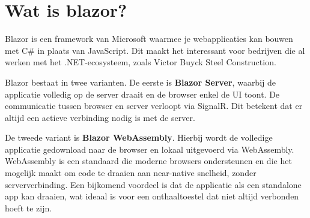 

\chapter{Wat is blazor?}

Blazor is een framework van Microsoft waarmee je webapplicaties kan bouwen 
met C\# in plaats van JavaScript. Dit maakt het interessant voor bedrijven 
die al werken met het .NET-ecosysteem, zoals Victor Buyck Steel Construction.

\bigskip
Blazor bestaat in twee varianten. De eerste is \textbf{Blazor Server}, waarbij 
de applicatie volledig op de server draait en de browser enkel de UI toont. 
De communicatie tussen browser en server verloopt via SignalR. Dit betekent 
dat er altijd een actieve verbinding nodig is met de server.

\bigskip
De tweede variant is \textbf{Blazor WebAssembly}. Hierbij wordt de volledige 
applicatie gedownload naar de browser en lokaal uitgevoerd via WebAssembly. 
WebAssembly is een standaard die moderne browsers ondersteunen en die het 
mogelijk maakt om code te draaien aan near-native snelheid, zonder 
serververbinding. Een bijkomend voordeel is dat de applicatie als een 
standalone app kan draaien, wat ideaal is voor een onthaaltoestel dat 
niet altijd verbonden hoeft te zijn.

